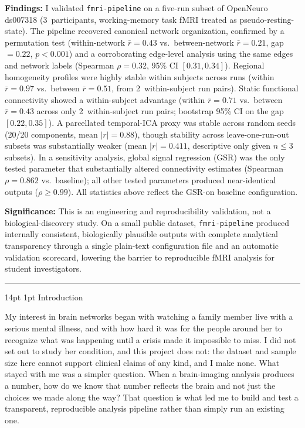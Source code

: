 \documentclass[12pt]{article}
\makeatletter
\renewcommand\section{%
  \@startsection{section}{1}{\z@}%
    {14pt \@plus 4pt \@minus 2pt}%
    {1pt}%
    {\normalfont\large\bfseries\color{black}}}
\makeatother
\begin{document}
\noindent\textbf{Findings:}
I validated \texttt{fmri-pipeline} on a five-run subset of OpenNeuro
ds007318 (3~participants, working-memory task fMRI treated as
pseudo-resting-state). The pipeline recovered canonical network
organization, confirmed by a permutation test (within-network
$\bar{r} = 0.43$ vs.\ between-network $\bar{r} = 0.21$, gap $= 0.22$,
$p < 0.001$) and a corroborating edge-level analysis using the same
edges and network labels (Spearman $\rho = 0.32$, 95\% CI
$[0.31, 0.34]$). Regional homogeneity profiles were highly stable
within subjects across runs (within $\bar{r} = 0.97$ vs.\ between
$\bar{r} = 0.51$, from 2~within-subject run pairs). Static functional
connectivity showed a within-subject advantage (within $\bar{r} = 0.71$
vs.\ between $\bar{r} = 0.43$ across only 2~within-subject run pairs;
bootstrap 95\% CI on the gap $[0.22, 0.35]$). A parcellated
temporal-ICA proxy was stable across random seeds (20/20 components,
mean $|r| = 0.88$), though stability across leave-one-run-out subsets
was substantially weaker (mean $|r| = 0.411$, descriptive only given
$n \leq 3$ subsets). In a sensitivity analysis, global signal
regression (GSR) was the only tested parameter that substantially
altered connectivity estimates (Spearman $\rho = 0.862$ vs.\ baseline);
all other tested parameters produced near-identical outputs
($\rho \geq 0.99$). All statistics above reflect the GSR-on baseline
configuration.

\noindent\textbf{Significance:}
This is an engineering and reproducibility validation, not a
biological-discovery study. On a small public dataset,
\texttt{fmri-pipeline} produced internally consistent, biologically
plausible outputs with complete analytical transparency through a single
plain-text configuration file and an automatic validation scorecard,
lowering the barrier to reproducible fMRI analysis for student
investigators.

\rule{\linewidth}{0.4pt}

\section{Introduction}

My interest in brain networks began with watching a family member live
with a serious mental illness, and with how hard it was for the
people around her to recognize what was happening until a crisis made it
impossible to miss. I did not set out to study her condition, and this
project does not: the dataset and sample size here cannot support
clinical claims of any kind, and I make none. What stayed with me was a
simpler question. When a brain-imaging analysis produces a number, how
do we know that number reflects the brain and not just the choices we
made along the way? That question is what led me to build and test a
transparent, reproducible analysis pipeline rather than simply run an
existing one.
\end{document}
